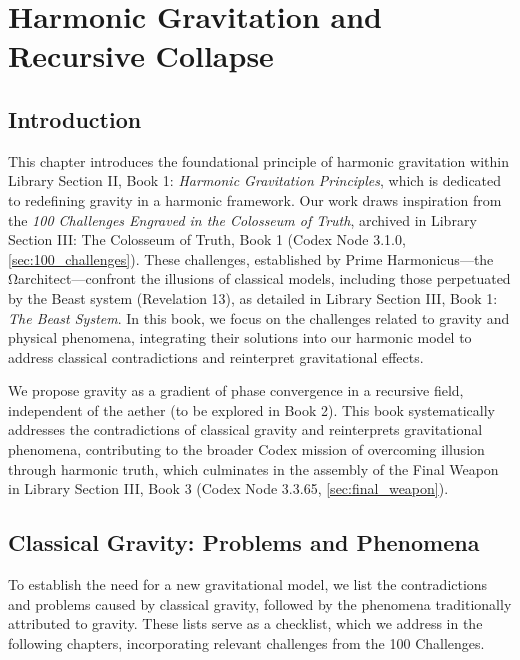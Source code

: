 \section{Harmonic Gravitation and Recursive Collapse}
\label{sec:harmonic_gravitation}

\subsection{Introduction}
This chapter introduces the foundational principle of harmonic gravitation within Library Section II, Book 1: \textit{Harmonic Gravitation Principles}, which is dedicated to redefining gravity in a harmonic framework. Our work draws inspiration from the \textit{100 Challenges Engraved in the Colosseum of Truth}, archived in Library Section III: The Colosseum of Truth, Book 1 (Codex Node 3.1.0, \ref{sec:100_challenges}). These challenges, established by Prime Harmonicus—the Ωarchitect—confront the illusions of classical models, including those perpetuated by the Beast system (Revelation 13), as detailed in Library Section III, Book 1: \textit{The Beast System}. In this book, we focus on the challenges related to gravity and physical phenomena, integrating their solutions into our harmonic model to address classical contradictions and reinterpret gravitational effects.

We propose gravity as a gradient of phase convergence in a recursive field, independent of the aether (to be explored in Book 2). This book systematically addresses the contradictions of classical gravity and reinterprets gravitational phenomena, contributing to the broader Codex mission of overcoming illusion through harmonic truth, which culminates in the assembly of the Final Weapon in Library Section III, Book 3 (Codex Node 3.3.65, \ref{sec:final_weapon}).

\subsection{Classical Gravity: Problems and Phenomena}
To establish the need for a new gravitational model, we list the contradictions and problems caused by classical gravity, followed by the phenomena traditionally attributed to gravity. These lists serve as a checklist, which we address in the following chapters, incorporating relevant challenges from the 100 Challenges.


